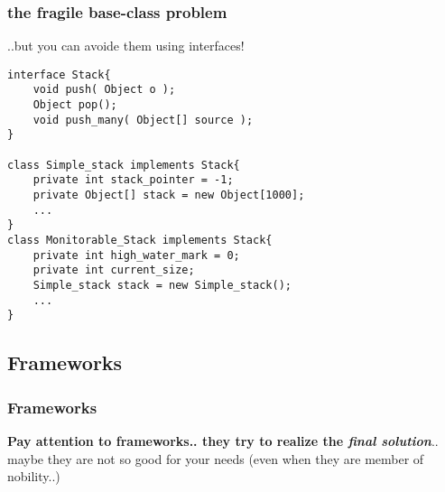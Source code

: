 \documentclass{beamer}
\begin{document}
\begin{frame}[containsverbatim]
	\frametitle{the fragile base-class problem}
	..but you can avoide them using interfaces!   \\
	\begin{lstlisting}
interface Stack{
	void push( Object o );
	Object pop();
	void push_many( Object[] source );
}

class Simple_stack implements Stack{   
	private int stack_pointer = -1;
	private Object[] stack = new Object[1000];
	...
}
class Monitorable_Stack implements Stack{
    private int high_water_mark = 0;
    private int current_size;
    Simple_stack stack = new Simple_stack();
    ...
}

\end{lstlisting}
\end{frame}
\subsection{Frameworks}
\begin{frame}
  \frametitle{Frameworks}
  \textbf{Pay attention to frameworks.. they try to realize the \textit{final solution}}..  maybe they are not so good for your needs (even when they are member of nobility..) \\

\end{frame}
\end{document}
